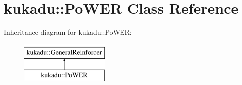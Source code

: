 \hypertarget{classkukadu_1_1PoWER}{\section{kukadu\-:\-:Po\-W\-E\-R Class Reference}
\label{classkukadu_1_1PoWER}
}
Inheritance diagram for kukadu\-:\-:Po\-W\-E\-R\-:\begin{figure}[H]
\begin{center}
\leavevmode
\includegraphics[height=2.000000cm]{classkukadu_1_1PoWER}
\end{center}
\end{figure}
